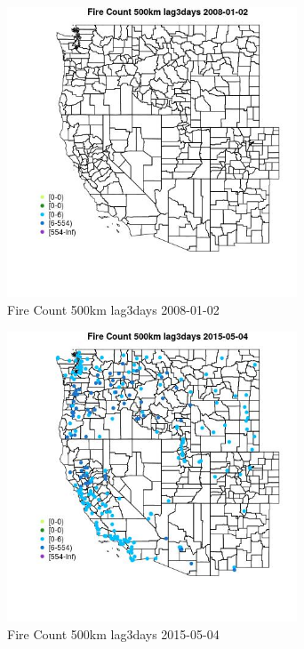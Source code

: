 \begin{figure} 
\centering  
\includegraphics[width=0.77\textwidth]{Code_Outputs/Report_ML_input_PM25_Step4_part_e_de_duplicated_aves_compiled_2019-05-18wNAs_MapObsFire_Count_500km_lag3days2008-01-02.jpg} 
\caption{\label{fig:Report_ML_input_PM25_Step4_part_e_de_duplicated_aves_compiled_2019-05-18wNAsMapObsFire_Count_500km_lag3days2008-01-02}Fire Count 500km lag3days 2008-01-02} 
\end{figure} 
 

\clearpage 

\begin{figure} 
\centering  
\includegraphics[width=0.77\textwidth]{Code_Outputs/Report_ML_input_PM25_Step4_part_e_de_duplicated_aves_compiled_2019-05-18wNAs_MapObsFire_Count_500km_lag3days2015-05-04.jpg} 
\caption{\label{fig:Report_ML_input_PM25_Step4_part_e_de_duplicated_aves_compiled_2019-05-18wNAsMapObsFire_Count_500km_lag3days2015-05-04}Fire Count 500km lag3days 2015-05-04} 
\end{figure} 
 

